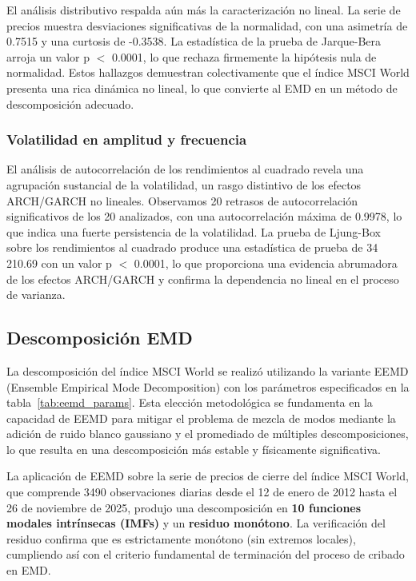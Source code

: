 \documentclass[11pt,a4paper]{article}
\begin{document}
El análisis distributivo respalda aún más la caracterización no lineal. La serie de precios muestra desviaciones significativas de la normalidad, con una asimetría de 0.7515 y una curtosis de -0.3538. La estadística de la prueba de Jarque-Bera arroja un valor p $<$ 0.0001, lo que rechaza firmemente la hipótesis nula de normalidad. Estos hallazgos demuestran colectivamente que el índice MSCI World presenta una rica dinámica no lineal, lo que convierte al EMD en un método de descomposición adecuado.

\subsubsection{Volatilidad en amplitud y frecuencia}

El análisis de autocorrelación de los rendimientos al cuadrado revela una agrupación sustancial de la volatilidad, un rasgo distintivo de los efectos ARCH/GARCH no lineales. Observamos 20 retrasos de autocorrelación significativos de los 20 analizados, con una autocorrelación máxima de 0.9978, lo que indica una fuerte persistencia de la volatilidad. La prueba de Ljung-Box sobre los rendimientos al cuadrado produce una estadística de prueba de 34 210.69 con un valor p $<$ 0.0001, lo que proporciona una evidencia abrumadora de los efectos ARCH/GARCH y confirma la dependencia no lineal en el proceso de varianza.

\subsection{Descomposición EMD}

La descomposición del índice MSCI World se realizó utilizando la variante EEMD (Ensemble Empirical Mode Decomposition) con los parámetros especificados en la tabla~\ref{tab:eemd_params}. Esta elección metodológica se fundamenta en la capacidad de EEMD para mitigar el problema de mezcla de modos mediante la adición de ruido blanco gaussiano y el promediado de múltiples descomposiciones, lo que resulta en una descomposición más estable y físicamente significativa.

La aplicación de EEMD sobre la serie de precios de cierre del índice MSCI World, que comprende 3490 observaciones diarias desde el 12 de enero de 2012 hasta el 26 de noviembre de 2025, produjo una descomposición en \textbf{10 funciones modales intrínsecas (IMFs)} y un \textbf{residuo monótono}. La verificación del residuo confirma que es estrictamente monótono (sin extremos locales), cumpliendo así con el criterio fundamental de terminación del proceso de cribado en EMD.
\end{document}
